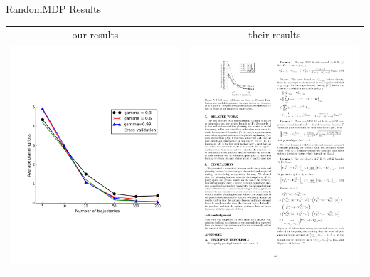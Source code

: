 \documentclass{beamer}
\begin{document}
\begin{frame}{RandomMDP Results}

\begin{tabular}{cc}
our results & their results \\
	\includegraphics[page=1,height=.55\textheight,width=.5\textwidth]{../results/figure_2.pdf} &
	\includegraphics[page=1,width=.41\textwidth]{../results/originalCV.pdf}
\end{tabular}


\end{frame}
\end{document}
